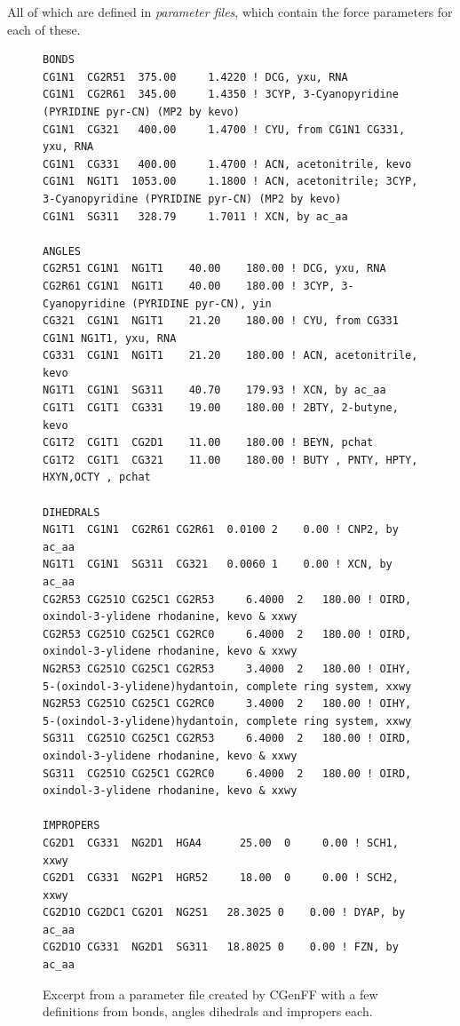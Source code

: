 \documentclass[oneside]{scrreprt}
\begin{document}
All of which are defined in \emph{parameter files}, which contain the force parameters for each of these.

\begin{figure}
\tiny
\begin{verbatim}
BONDS
CG1N1  CG2R51  375.00     1.4220 ! DCG, yxu, RNA
CG1N1  CG2R61  345.00     1.4350 ! 3CYP, 3-Cyanopyridine (PYRIDINE pyr-CN) (MP2 by kevo)
CG1N1  CG321   400.00     1.4700 ! CYU, from CG1N1 CG331, yxu, RNA
CG1N1  CG331   400.00     1.4700 ! ACN, acetonitrile, kevo
CG1N1  NG1T1  1053.00     1.1800 ! ACN, acetonitrile; 3CYP, 3-Cyanopyridine (PYRIDINE pyr-CN) (MP2 by kevo)
CG1N1  SG311   328.79     1.7011 ! XCN, by ac_aa            

ANGLES
CG2R51 CG1N1  NG1T1    40.00    180.00 ! DCG, yxu, RNA
CG2R61 CG1N1  NG1T1    40.00    180.00 ! 3CYP, 3-Cyanopyridine (PYRIDINE pyr-CN), yin
CG321  CG1N1  NG1T1    21.20    180.00 ! CYU, from CG331 CG1N1 NG1T1, yxu, RNA
CG331  CG1N1  NG1T1    21.20    180.00 ! ACN, acetonitrile, kevo
NG1T1  CG1N1  SG311    40.70    179.93 ! XCN, by ac_aa                
CG1T1  CG1T1  CG331    19.00    180.00 ! 2BTY, 2-butyne, kevo
CG1T2  CG1T1  CG2D1    11.00    180.00 ! BEYN, pchat
CG1T2  CG1T1  CG321    11.00    180.00 ! BUTY , PNTY, HPTY, HXYN,OCTY , pchat

DIHEDRALS
NG1T1  CG1N1  CG2R61 CG2R61  0.0100 2    0.00 ! CNP2, by ac_aa
NG1T1  CG1N1  SG311  CG321   0.0060 1    0.00 ! XCN, by ac_aa
CG2R53 CG251O CG25C1 CG2R53     6.4000  2   180.00 ! OIRD, oxindol-3-ylidene rhodanine, kevo & xxwy
CG2R53 CG251O CG25C1 CG2RC0     6.4000  2   180.00 ! OIRD, oxindol-3-ylidene rhodanine, kevo & xxwy
NG2R53 CG251O CG25C1 CG2R53     3.4000  2   180.00 ! OIHY, 5-(oxindol-3-ylidene)hydantoin, complete ring system, xxwy
NG2R53 CG251O CG25C1 CG2RC0     3.4000  2   180.00 ! OIHY, 5-(oxindol-3-ylidene)hydantoin, complete ring system, xxwy
SG311  CG251O CG25C1 CG2R53     6.4000  2   180.00 ! OIRD, oxindol-3-ylidene rhodanine, kevo & xxwy
SG311  CG251O CG25C1 CG2RC0     6.4000  2   180.00 ! OIRD, oxindol-3-ylidene rhodanine, kevo & xxwy

IMPROPERS
CG2D1  CG331  NG2D1  HGA4      25.00  0     0.00 ! SCH1, xxwy
CG2D1  CG331  NG2P1  HGR52     18.00  0     0.00 ! SCH2, xxwy
CG2D1O CG2DC1 CG2O1  NG2S1   28.3025 0    0.00 ! DYAP, by ac_aa              
CG2D1O CG331  NG2D1  SG311   18.8025 0    0.00 ! FZN, by ac_aa
\end{verbatim}
   \caption{Excerpt from a parameter file created by CGenFF with a few definitions from bonds, angles dihedrals and impropers each.}
    \label{fig:parmfile}
\end{figure}
\end{document}
